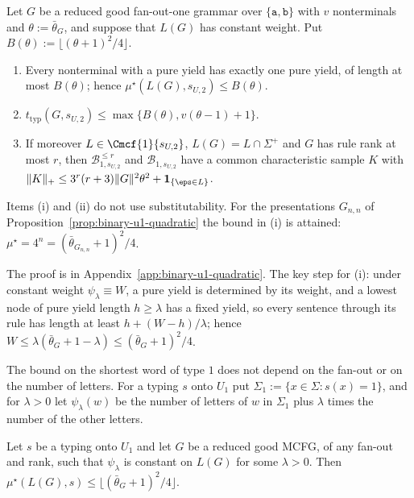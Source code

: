 \begin{proposition}
\label{prop:binary-u1-weight-slice}
Let $G$ be a reduced good fan-out-one grammar over $\{\mathtt a,\mathtt b\}$ with
$v$ nonterminals and $\theta:=\bar\theta_G$, and suppose that $L(G)$ has constant
weight.  Put $B(\theta):=\lfloor(\theta+1)^2/4\rfloor$.
\begin{enumerate}[label=\textup{(\roman*)},leftmargin=*]
\item Every nonterminal with a pure yield has exactly one pure yield, of
length at most $B(\theta)$; hence $\mu^\star(L(G),s_{U,2})\le B(\theta)$.
\item $t_{\mathrm{typ}}(G,s_{U,2})\le\max\{B(\theta),v(\theta-1)+1\}$.
\item If moreover $L\in\Cmcf{1}{s_{U,2}}$, $L(G)=L\cap\Sigma^+$ and $G$ has rule rank
at most $r$, then $\mathcal B^{\le r}_{1,s_{U,2}}$ and $\mathcal B_{1,s_{U,2}}$ have a
common characteristic sample $K$ with
$\|K\|_+\le3^r(r+3)\|G\|^2\theta^2+\mathbf 1_{\{\eps\in L\}}$.
\end{enumerate}
Items \textup{(i)} and \textup{(ii)} do not use substitutability.  For the
presentations $G_{n,n}$ of Proposition~\ref{prop:binary-u1-quadratic} the bound in
\textup{(i)} is attained: $\mu^\star=4^n=(\bar\theta_{G_{n,n}}+1)^2/4$.
\end{proposition}

The proof is in Appendix~\ref{app:binary-u1-quadratic}.  The key step for (i):
under constant weight $\psi_\lambda\equiv W$, a pure yield is determined by its
weight, and a lowest node of pure yield length $h\ge\lambda$ has a fixed yield, so
every sentence through its rule has length at least $h+(W-h)/\lambda$; hence
$W\le\lambda(\bar\theta_G+1-\lambda)\le(\bar\theta_G+1)^2/4$.


The bound on the shortest word of type $1$ does not depend on the fan-out or on
the number of letters.  For a typing $s$ onto $U_1$ put
$\Sigma_1:=\{x\in\Sigma:s(x)=1\}$, and for $\lambda>0$ let $\psi_\lambda(w)$ be
the number of letters of $w$ in $\Sigma_1$ plus $\lambda$ times the number of the
other letters.

\begin{proposition}
\label{prop:u1-weight-all-fanout}
Let $s$ be a typing onto $U_1$ and let $G$ be a reduced good MCFG, of any fan-out
and rank, such that $\psi_\lambda$ is constant on $L(G)$ for some $\lambda>0$.
Then $\mu^\star(L(G),s)\le\lfloor(\bar\theta_G+1)^2/4\rfloor$.
\end{proposition}

